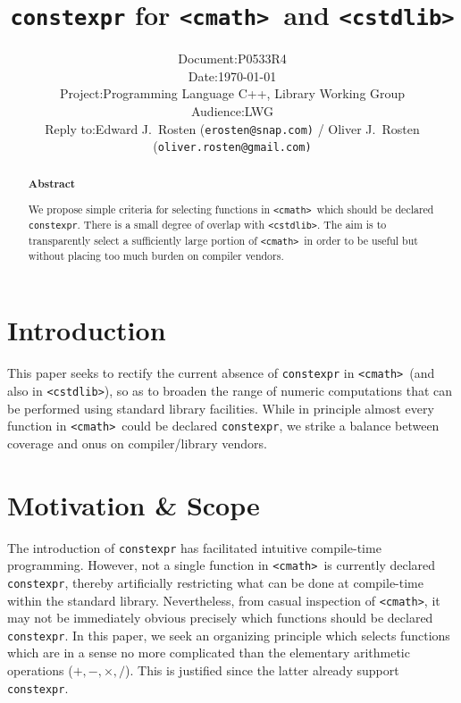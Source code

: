 \documentclass[prd,twocolumn,amsmath,amssymb,nofootinbib,eqsecnum]{revtex4-1}
\newcommand{\constexpr}{\code{constexpr}\xspace}
\newcommand{\code}[1]{{\tt #1}}
\newcommand{\header}[1]{{\tt <#1>}}
\newcommand{\cmath}{\header{cmath}}
\newcommand{\cstdlib}{\header{cstdlib}}
\newcommand{\Operators}{\ensuremath{+,-,\times,/}}
\begin{document}
\title{\constexpr for \cmath\ and \cstdlib}

\author{
\hspace{11.5em}
\begin{tabular}{ll}
	Document: & P0533R4
\\
	Date: & \today
\\
	Project: & Programming Language C++, Library Working Group
\\
	Audience: & LWG
\\
	Reply to: & Edward J.\ Rosten {(\tt erosten@snap.com)}
 / Oliver J.\ Rosten {(\tt oliver.rosten@gmail.com)}
\end{tabular}
}

\begin{abstract}

\begin{center} {\bf Abstract} \end{center}
We propose simple criteria for selecting functions in \cmath\ which should be
declared \constexpr. There is a small degree of overlap with \cstdlib.
 The aim is to transparently select a sufficiently large portion of \cmath\ 
in order to be useful but without placing too much burden on compiler vendors.
	
\end{abstract}


\maketitle

\tableofcontents

\section{Introduction}

This paper seeks to rectify the current absence of \constexpr in
\cmath\ (and also in \cstdlib), so as to broaden the range of numeric computations that can be
performed using standard library facilities. While in principle almost every function
in \cmath\ could be declared \constexpr, we strike a balance between coverage and onus on compiler/library vendors.


\section{Motivation \& Scope}

The introduction of \constexpr has facilitated intuitive compile-time
programming. However, not a single function in \cmath\ is currently declared \constexpr,
thereby artificially restricting what can be done at compile-time within the standard library.
Nevertheless, from casual inspection of \cmath, it may
not be immediately obvious precisely which functions should be declared
\constexpr. In this paper, we seek an organizing principle which selects functions
which are in a sense no more complicated than the elementary arithmetic operations
(\Operators). This is justified since the latter already support \constexpr.
\end{document}
